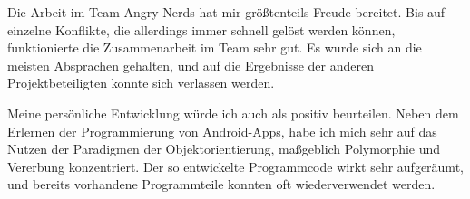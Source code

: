 Die Arbeit im Team Angry Nerds hat mir größtenteils Freude bereitet. Bis auf einzelne Konflikte, die allerdings immer schnell gelöst werden können, funktionierte die Zusammenarbeit im Team sehr gut. Es wurde sich an die meisten Absprachen gehalten, und auf die Ergebnisse der anderen Projektbeteiligten konnte sich verlassen werden.

Meine persönliche Entwicklung würde ich auch als positiv beurteilen. Neben dem Erlernen der Programmierung von Android-Apps, habe ich mich sehr auf das Nutzen der Paradigmen der Objektorientierung, maßgeblich Polymorphie und Vererbung konzentriert. Der so entwickelte Programmcode wirkt sehr aufgeräumt, und bereits vorhandene Programmteile konnten oft wiederverwendet werden.



